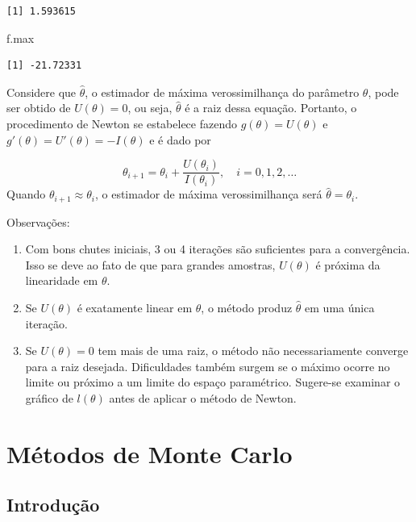 \documentclass[
  letterpaper,
  DIV=11,
  numbers=noendperiod]{scrreprt}
\newenvironment{Shaded}{\begin{snugshade}}{\end{snugshade}}
\newcommand{\NormalTok}[1]{\textcolor[rgb]{0.00,0.23,0.31}{#1}}
\providecommand{\tightlist}{%
  \setlength{\itemsep}{0pt}\setlength{\parskip}{0pt}}\usepackage{longtable,booktabs,array}
\begin{document}
\begin{verbatim}
[1] 1.593615
\end{verbatim}

\begin{Shaded}
\begin{Highlighting}[]
\NormalTok{f.max}
\end{Highlighting}
\end{Shaded}

\begin{verbatim}
[1] -21.72331
\end{verbatim}

Considere que \(\hat\theta\), o estimador de máxima verossimilhança do
parâmetro \(\theta\), pode ser obtido de \(U(\theta)=0\), ou seja,
\(\hat\theta\) é a raiz dessa equação. Portanto, o procedimento de
Newton se estabelece fazendo \(g(\theta)=U(\theta)\) e
\(g'(\theta)=U'(\theta)=-I(\theta)\) e é dado por

\[\theta_{i+1}  =  \theta_i + \dfrac{U(\theta_i)}{I(\theta_i)},\quad i=0,1,2,\ldots \]
Quando \(\theta_{i+1}\approx\theta_i\), o estimador de máxima
verossimilhança será \(\hat\theta=\theta_{i}\).

Observações:

\begin{enumerate}
\def\labelenumi{\arabic{enumi}.}
\tightlist
\item
  Com bons chutes iniciais, 3 ou 4 iterações são suficientes para a
  convergência. Isso se deve ao fato de que para grandes amostras,
  \(U(\theta)\) é próxima da linearidade em \(\theta\).
\item
  Se \(U(\theta)\) é exatamente linear em \(\theta\), o método produz
  \(\hat\theta\) em uma única iteração.
\item
  Se \(U(\theta)=0\) tem mais de uma raiz, o método não necessariamente
  converge para a raiz desejada. Dificuldades também surgem se o máximo
  ocorre no limite ou próximo a um limite do espaço paramétrico.
  Sugere-se examinar o gráfico de \(l(\theta)\) antes de aplicar o
  método de Newton.
\end{enumerate}


\chapter{Métodos de Monte Carlo}\label{muxe9todos-de-monte-carlo}

\section{Introdução}\label{introduuxe7uxe3o-2}
\end{document}
